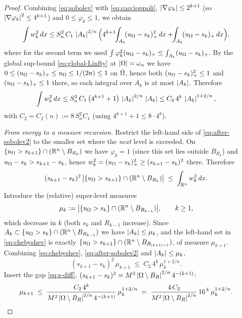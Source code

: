 \begin{proof}
Combining \eqref{eq:sobolev} with \eqref{eq:caccioppoli},
$\left|\nabla\varphi_k\right|\le2^{k+1}$ (so $\left|\nabla\varphi_k\right|^2\le4^{k+1}$)
and $0\le\varphi_k\le1$, we obtain
\begin{equation}\label{eq:after-sobolev}
   \int w_k^2\,dx
   \le S_n^2\,C_1\,\left|A_k\right|^{2/n}
   \Bigl(4^{k+1}\!\!\int_{A_k}\!(u_\Omega-s_k)_+^2\,dx
        +\!\!\int_{A_k}\!(u_\Omega-s_k)_+\,dx\Bigr),
\end{equation}
where for the second term we used
$\int\varphi_k^2(u_\Omega-s_k)_+\le\int_{A_k}(u_\Omega-s_k)_+$. By the global
sup-bound \eqref{eq:global-Linfty} at $\left|\Omega\right|=\omega_n$ we have
$0\le(u_\Omega-s_k)_+\le u_\Omega\le1/(2n)\le1$ on $\Omega$, hence both
$(u_\Omega-s_k)_+^2\le1$ and $(u_\Omega-s_k)_+\le1$ there, so each integral over
$A_k$ is at most $\left|A_k\right|$. Therefore
\begin{equation}\label{eq:after-sobolev2}
   \int w_k^2\,dx
   \le S_n^2\,C_1\,\bigl(4^{k+1}+1\bigr)\,\left|A_k\right|^{2/n}\,\left|A_k\right|
   \le C_2\,4^{k}\,\left|A_k\right|^{1+2/n},
\end{equation}
with $C_2=C_2(n):=8\,S_n^2 C_1$ (using $4^{k+1}+1\le8\cdot4^{k}$).

\smallskip
\emph{From energy to a measure recursion.} Restrict the left-hand side of
\eqref{eq:after-sobolev2} to the smaller set where the \emph{next} level
is exceeded. On $\{u_\Omega>s_{k+1}\}\cap(\mathbb R^n\setminus B_{R_{k}})$ we have
$\varphi_k=1$ (since this set lies outside $B_{R_k}$) and
$u_\Omega-s_k>s_{k+1}-s_k$, hence
$w_k^2=(u_\Omega-s_k)_+^2\ge(s_{k+1}-s_k)^2$ there. Therefore
\begin{equation}\label{eq:chebyshev}
   (s_{k+1}-s_k)^2\,
   \bigl|\{u_\Omega>s_{k+1}\}\cap(\mathbb R^n\setminus B_{R_{k}})\bigr|
   \;\le\;\int_{\mathbb R^n}w_k^2\,dx .
\end{equation}
Introduce the (relative) super-level measures
\[
   \mu_k:=\bigl|\{u_\Omega>s_k\}\cap(\mathbb R^n\setminus B_{R_{k-1}})\bigr|,
   \qquad k\ge1,
\]
which decrease in $k$ (both $s_k$ and $R_{k-1}$ increase). Since
$A_k\subset\{u_\Omega>s_k\}\cap(\mathbb R^n\setminus B_{R_{k-1}})$ we have
$\left|A_k\right|\le\mu_k$, and the left-hand set in \eqref{eq:chebyshev} is
exactly $\{u_\Omega>s_{k+1}\}\cap(\mathbb R^n\setminus B_{R_{(k+1)-1}})$, of
measure $\mu_{k+1}$. Combining \eqref{eq:chebyshev},
\eqref{eq:after-sobolev2} and $\left|A_k\right|\le\mu_k$,
\[
   (s_{k+1}-s_k)^2\,\mu_{k+1}
   \;\le\;C_2\,4^{k}\,\mu_k^{1+2/n}.
\]
Insert the gap \eqref{eq:s-diff},
$(s_{k+1}-s_k)^2=M^2\left|\Omega\setminus B_R\right|^{2/n}4^{-(k+1)}$:
\begin{equation}\label{eq:mu-recursion}
   \mu_{k+1}\;\le\;
   \frac{C_2\,4^{k}}{M^2\left|\Omega\setminus B_R\right|^{2/n}4^{-(k+1)}}\,
   \mu_k^{1+2/n}
   \;=\;\frac{4\,C_2}{M^2\left|\Omega\setminus B_R\right|^{2/n}}\,16^{\,k}\,
   \mu_k^{1+2/n}.
\end{equation}


\end{proof}
